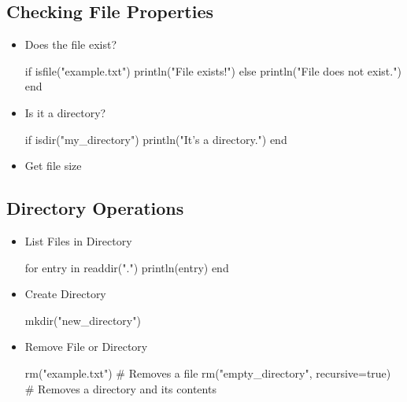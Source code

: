 \documentclass{report}
\begin{document}
     \bigbreak \noindent 
     \subsection{Checking File Properties}
     \bigbreak \noindent 
     \begin{itemize}
         \item Does the file exist?
             \bigbreak \noindent 
             \begin{jlcode}
                 if isfile("example.txt")
                     println("File exists!")
                 else
                     println("File does not exist.")
                 end
             \end{jlcode}
         \item Is it a directory?
             \bigbreak \noindent 
             \begin{jlcode}
                 if isdir("my_directory")
                     println("It's a directory.")
                 end
             \end{jlcode}
         \item Get file size
             \bigbreak \noindent 
     \end{itemize}

     \bigbreak \noindent 
     \subsection{Directory Operations}
     \bigbreak \noindent 
     \begin{itemize}
         \item List Files in Directory
             \bigbreak \noindent 
             \begin{jlcode}
                 for entry in readdir(".")
                     println(entry)
                 end
             \end{jlcode}
        \item Create Directory
            \bigbreak \noindent 
            \begin{jlcode}
            mkdir("new_directory")
            \end{jlcode}
        \item Remove File or Directory
            \bigbreak \noindent 
            \begin{jlcode}
                rm("example.txt")  # Removes a file
                rm("empty_directory", recursive=true)  # Removes a directory and its contents
            \end{jlcode}
     \end{itemize}
\end{document}

